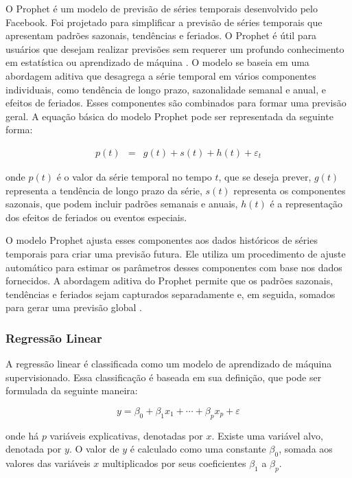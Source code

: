  O Prophet é um modelo de previsão de séries temporais desenvolvido pelo Facebook. Foi projetado para simplificar a previsão de séries temporais que apresentam padrões sazonais, tendências e feriados. O Prophet é útil para usuários que desejam realizar previsões sem requerer um profundo conhecimento em estatística ou aprendizado de máquina \cite{en16031371}. O modelo se baseia em uma abordagem aditiva que desagrega a série temporal em vários componentes individuais, como tendência de longo prazo, sazonalidade semanal e anual, e efeitos de feriados. Esses componentes são combinados para formar uma previsão geral.  A equação básica do modelo Prophet pode ser representada da seguinte forma:
 
 \begin{eqnarray}
 	p(t) &=& g(t) + s(t) + h(t) + \varepsilon_t 
 \end{eqnarray}
 
 \noindent onde $ p(t) $ é o valor da série temporal no tempo $ t $, que se deseja prever, $ g(t) $ representa a tendência de longo prazo da série, $ s(t) $ representa os componentes sazonais, que podem incluir padrões semanais e anuais, $ h(t) $ é a representação dos efeitos de feriados ou eventos especiais.
  
 O modelo Prophet ajusta esses componentes aos dados históricos de séries temporais para criar uma previsão futura. Ele utiliza um procedimento de ajuste automático para estimar os parâmetros desses componentes com base nos dados fornecidos. A abordagem aditiva do Prophet permite que os padrões sazonais, tendências e feriados sejam capturados separadamente e, em seguida, somados para gerar uma previsão global \cite{2-s2.0-85092514286}.
 
 
 \subsubsection{Regress\~ao Linear}
 
A regressão linear é classificada como um modelo de aprendizado de máquina supervisionado. Essa classificação é baseada em sua definição, que pode ser formulada da seguinte maneira:
 
 \begin{equation}
 	y = \beta_0 + \beta_1 x_1 + \cdots + \beta_p x_p + \varepsilon \label{eq:lr}
 \end{equation}
 
 \noindent onde há $p$ variáveis explicativas, denotadas por $x$. Existe uma variável alvo, denotada por $y$. O valor de $y$ é calculado como uma constante $\beta_0$, somada aos valores das variáveis $x$ multiplicados por seus coeficientes $\beta_1$ a $\beta_p$.
 
